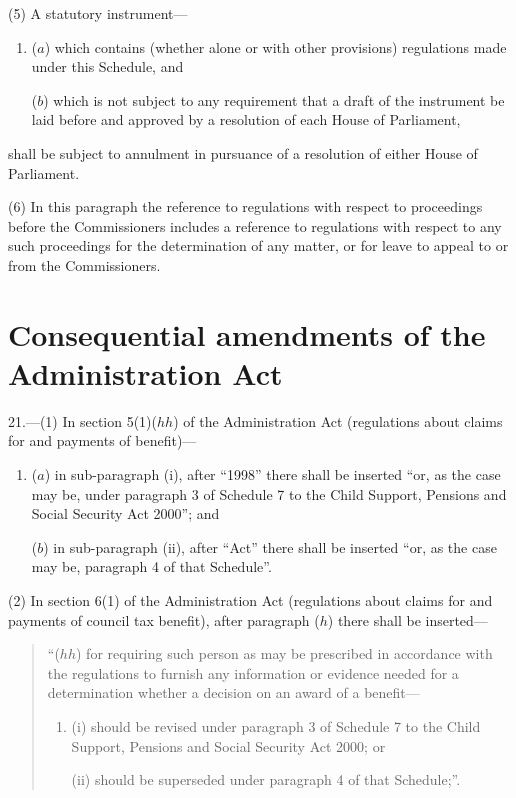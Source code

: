 \documentclass[12pt,a4paper]{article}
\begin{document}
(5) A statutory instrument—
\begin{enumerate}\item[]
($a$) which contains (whether alone or with other provisions) regulations made under this Schedule, and

($b$) which is not subject to any requirement that a draft of the instrument be laid before and approved by a resolution of each House of Parliament,
\end{enumerate}
shall be subject to annulment in pursuance of a resolution of either House of Parliament.

(6) In this paragraph the reference to regulations with respect to proceedings before the Commissioners includes a reference to regulations with respect to any such proceedings for the determination of any matter, or for leave to appeal to or from the Commissioners.

\section*{\sloppy Consequential amendments of the Administration Act}

21.---(1) In section 5(1)($hh$)  of the Administration Act (regulations about claims for and payments of benefit)—
\begin{enumerate}\item[]
($a$) in sub-paragraph (i), after “1998” there shall be inserted “or, as the case may be, under paragraph 3 of Schedule 7 to the Child Support, Pensions and Social Security Act 2000”; and

($b$) in sub-paragraph (ii), after “Act” there shall be inserted “or, as the case may be, paragraph 4 of that Schedule”.
\end{enumerate}

(2) In section 6(1)  of the Administration Act (regulations about claims for and payments of council tax benefit), after paragraph ($h$)  there shall be inserted—
\begin{quotation}
“($hh$) for requiring such person as may be prescribed in accordance with the regulations to furnish any information or evidence needed for a determination whether a decision on an award of a benefit—
\begin{enumerate}\item[]
(i) should be revised under paragraph 3 of Schedule 7 to the Child Support, Pensions and Social Security Act 2000; or

(ii) should be superseded under paragraph 4 of that Schedule;”.
\end{enumerate}
\end{quotation}
\end{document}

